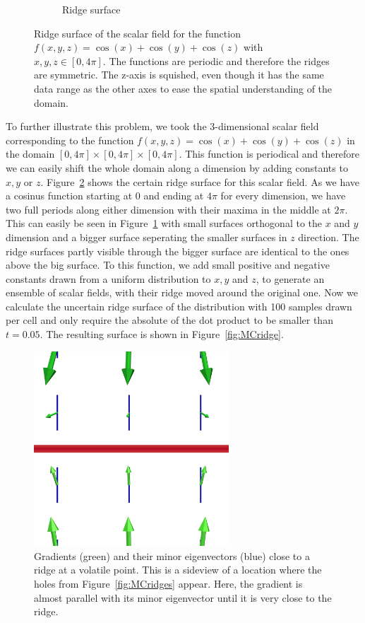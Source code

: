 \begin{figure}[t]
\begin{subfigure}[b]{0.49\textwidth}
        \caption{Ridge surface}
        \label{fig:certainRidge}
    \end{subfigure}
    \caption{Ridge surface of the scalar field for the function
    $f(x,y,z)=\cos(x)+\cos(y) +\cos(z)$ with $x,y,z \in [0, 4\pi]$. The
    functions are periodic and therefore the ridges are symmetric. The
    z-axis is squished, even though it has the same data range as the
    other axes to ease the spatial understanding of the domain.}
    \label{fig:ridge}
\end{figure}
\indent To further illustrate this problem, we took the 3-dimensional
scalar field corresponding to the function $f(x,y,z) = \cos{(x)} +
\cos{(y)} + \cos{(z)}$ in the domain $[0, 4 \pi] \times [0, 4\pi] \times
[0, 4\pi]$. This function is periodical and therefore we can easily
shift the whole domain along a dimension by adding constants to $x, y$
or $z$. Figure~\ref{fig:ridge} shows the certain ridge surface for this
scalar field. As we have a cosinus function starting at 0 and ending at
$4\pi$ for every dimension, we have two full periods along either
dimension with their maxima in the middle at $2\pi$. This can easily be
seen in Figure~\ref{fig:certainRidge} with small surfaces orthogonal to
the $x$ and $y$ dimension and a bigger surface seperating the smaller
surfaces in $z$ direction. The ridge surfaces partly visible through the
bigger surface are identical to the ones above the big surface. To this
function, we add small positive and negative constants drawn from a
uniform distribution to $x, y$ and $z$, to generate an ensemble of
scalar fields, with their ridge moved around the original one. Now we
calculate the uncertain ridge surface of the distribution with 100
samples drawn per cell and only require the absolute of the dot product
to be smaller than $t=0.05$. The resulting surface is shown in
Figure~\ref{fig:MCridge}.
\begin{figure}
    \centering
    \includegraphics[trim= 0 300 0 305, clip=true, width=0.65\textwidth]{Images/weakridge.png}
    \caption{Gradients (green) and their minor eigenvectors (blue) close to
    a ridge at a volatile point. This is a sideview of a location where the
    holes from Figure~\ref{fig:MCridges} appear. Here, the gradient is almost
    parallel with its minor eigenvector until it is very close to the ridge.}
    \label{fig:volatile}
\end{figure}
